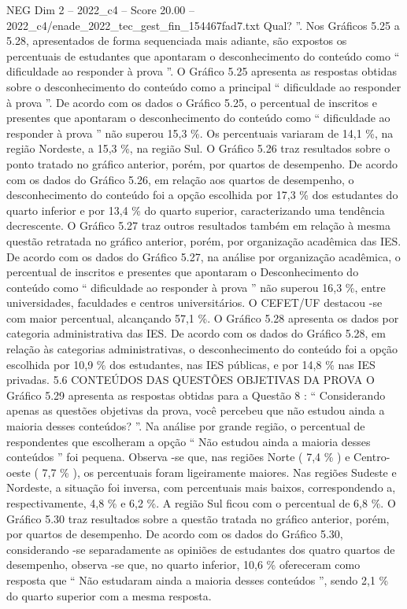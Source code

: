\begin{textsample}{NEG Dim 2 – 2022\_c4 – Score 20.00 – 2022\_c4/enade\_2022\_tec\_gest\_fin\_154467fad7.txt}
Qual? ”.
Nos Gráficos 5.25 a 5.28, apresentados de forma sequenciada mais adiante, são expostos os percentuais de estudantes que apontaram o desconhecimento do conteúdo como “ dificuldade ao responder à prova ”.
O Gráfico 5.25 apresenta as respostas obtidas sobre o desconhecimento do conteúdo como a principal “ dificuldade ao responder à prova ”.
De acordo com os dados o Gráfico 5.25, o percentual de inscritos e presentes que apontaram o desconhecimento do conteúdo como “ dificuldade ao responder à prova ” não superou 15,3 \%.
Os percentuais variaram de 14,1 \%, na região Nordeste, a 15,3 \%, na região Sul.
O Gráfico 5.26 traz resultados sobre o ponto tratado no gráfico anterior, porém, por quartos de desempenho.
De acordo com os dados do Gráfico 5.26, em relação aos quartos de desempenho, o desconhecimento do conteúdo foi a opção escolhida por 17,3 \% dos estudantes do quarto inferior e por 13,4 \% do quarto superior, caracterizando uma tendência decrescente.
O Gráfico 5.27 traz outros resultados também em relação à mesma questão retratada no gráfico anterior, porém, por organização acadêmica das IES.
De acordo com os dados do Gráfico 5.27, na análise por organização acadêmica, o percentual de inscritos e presentes que apontaram o Desconhecimento do conteúdo como “ dificuldade ao responder à prova ” não superou 16,3 \%, entre universidades, faculdades e centros universitários.
O CEFET/UF destacou -se com maior percentual, alcançando 57,1 \%.
O Gráfico 5.28 apresenta os dados por categoria administrativa das IES.
De acordo com os dados do Gráfico 5.28, em relação às categorias administrativas, o desconhecimento do conteúdo foi a opção escolhida por 10,9 \% dos estudantes, nas IES públicas, e por 14,8 \% nas IES privadas. 5.6 CONTEÚDOS DAS QUESTÕES OBJETIVAS DA PROVA O Gráfico 5.29 apresenta as respostas obtidas para a Questão 8 : “ Considerando apenas as questões objetivas da prova, você percebeu que não estudou ainda a maioria desses conteúdos? ”.
Na análise por grande região, o percentual de respondentes que escolheram a opção “ Não estudou ainda a maioria desses conteúdos ” foi pequena.
Observa -se que, nas regiões Norte ( 7,4 \% ) e Centro-oeste ( 7,7 \% ), os percentuais foram ligeiramente maiores.
Nas regiões Sudeste e Nordeste, a situação foi inversa, com percentuais mais baixos, correspondendo a, respectivamente, 4,8 \% e 6,2 \%.
A região Sul ficou com o percentual de 6,8 \%.
O Gráfico 5.30 traz resultados sobre a questão tratada no gráfico anterior, porém, por quartos de desempenho.
De acordo com os dados do Gráfico 5.30, considerando -se separadamente as opiniões de estudantes dos quatro quartos de desempenho, observa -se que, no quarto inferior, 10,6 \% ofereceram como resposta que “ Não estudaram ainda a maioria desses conteúdos ”, sendo 2,1 \% do quarto superior com a mesma resposta.

\end{textsample}
